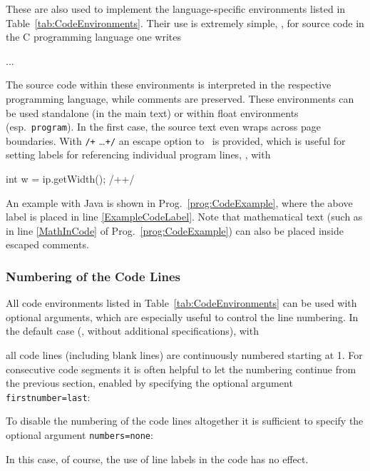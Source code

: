 These are also used to implement the language-specific environments listed in
Table~\ref{tab:CodeEnvironments}. Their use is extremely simple, \eg, for
source code in the C programming language one writes
%
\begin{GenericCode}[numbers=none]
\begin{CCode}
    ... 
\end{CCode}
\end{GenericCode}
%
The source code within these environments is interpreted in the respective
programming language, while comments are preserved. These environments can be
used standalone (in the main text) or within float environments (esp.\
\texttt{program}). In the first case, the source text even wraps across page
boundaries. With \verb!/+! \ldots \verb!+/! an escape option to \latex\ is
provided, which is useful for setting labels for referencing individual
program lines, \eg, with
%
\begin{GenericCode}[numbers=none]
int w = ip.getWidth(); /+\label{ExampleCodeLabel}+/
\end{GenericCode}
%
An example with Java is shown in Prog.~\ref{prog:CodeExample}, where the
above label is placed in line \ref{ExampleCodeLabel}. Note that mathematical
text (such as in line \ref{MathInCode} of Prog.~\ref{prog:CodeExample}) can
also be placed inside escaped comments.


\subsubsection{Numbering of the Code Lines}

All code environments listed in Table~\ref{tab:CodeEnvironments} can be used
with optional arguments, which are especially useful to control the line
numbering. In the default case (\ie, without additional specifications), with
%
%
all code lines (including blank lines) are continuously numbered starting at
1. For consecutive code segments it is often helpful to let the numbering
continue from the previous section, enabled by specifying the optional argument
\texttt{firstnumber={\obnh}last}:
%
%
To disable the numbering of the code lines altogether it is sufficient to
specify the optional argument
\texttt{numbers={\obnh}none}:
%
%
In this case, of course, the use of line labels in the code has no effect.


